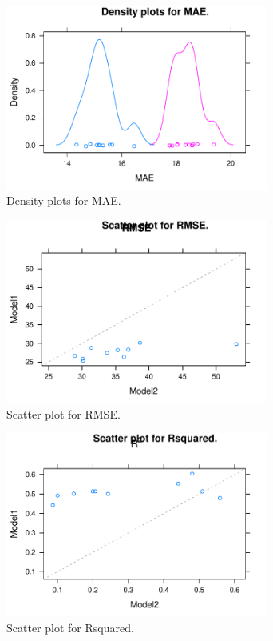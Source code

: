 \begin{figure} 
\centering  
\includegraphics[width=0.77\textwidth]{Code_Outputs/ML_compare_models_densityplot_MAE.pdf} 
\caption{\label{fig:ML_compare_modelsdensityplot_MAE}Density plots for MAE.} 
\end{figure} 
 

\begin{figure} 
\centering  
\includegraphics[width=0.77\textwidth]{Code_Outputs/ML_compare_models_xyplot_RMSE.pdf} 
\caption{\label{fig:ML_compare_modelsxyplot_RMSE}Scatter plot for RMSE.} 
\end{figure} 
 

\begin{figure} 
\centering  
\includegraphics[width=0.77\textwidth]{Code_Outputs/ML_compare_models_xyplot_Rsquared.pdf} 
\caption{\label{fig:ML_compare_modelsxyplot_Rsquared}Scatter plot for Rsquared.} 
\end{figure} 
 

